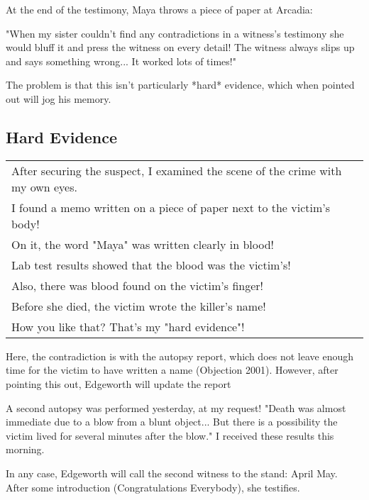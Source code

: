 At the end of the testimony, Maya throws a piece of paper at Arcadia:
\begin{center}
"When my sister couldn't find any contradictions in a witness's testimony she would bluff it and press the witness on every detail! The witness always slips up and says something wrong... It worked lots of times!"
\end{center}
The problem is that this isn't particularly *hard* evidence, which when pointed out will jog his memory.

\subsection{Hard Evidence}
\begin{tabular}{p{11cm}}
After securing the suspect, I examined the scene of the crime with my own eyes.\\
I found a memo written on a piece of paper next to the victim's body!\\
On it, the word "Maya" was written clearly in blood!\\
Lab test results showed that the blood was the victim's!\\
Also, there was blood found on the victim's finger!\\
Before she died, the victim wrote the killer's name!\\
How you like that? That's my "hard evidence"! \\
\end{tabular}

Here, the contradiction is with the autopsy report, which does not leave enough time for the victim to have written a name (Objection 2001). However, after pointing this out, Edgeworth will update the report
\begin{center}
A second autopsy was performed yesterday, at my request! "Death was almost immediate due to a blow from a blunt object... But there is a possibility the victim lived for several minutes after the blow." I received these results this morning. 
\end{center}

In any case, Edgeworth will call the second witness to the stand: April May. After some introduction (Congratulations Everybody), she testifies.

